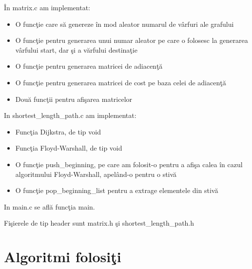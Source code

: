 \documentclass{article}
\begin{document}
\^{I}n matrix.c am implementat:
\begin{itemize}
    \item O func\c{t}ie care s\u{a} genereze \^{i}n mod aleator numarul de v\^{a}rfuri ale grafului
    \item O func\c{t}ie pentru generarea unui numar aleator pe care o folosesc la generarea v\^{a}rfului start, dar \c{s}i a v\u{a}rfului destina\c{t}ie
    \item O func\c{t}ie pentru generarea matricei de adiacen\c{t}\u{a}
    \item O func\c{t}ie pentru generarea matricei de cost pe baza celei de adiacen\c{t}\u{a}
    \item Dou\u{a} func\c{t}ii pentru afi\c{s}area matricelor
\end{itemize}

In shortest\_length\_path.c am implementat:
\begin{itemize}
    \item Func\c{t}ia Dijkstra, de tip void
    \item Func\c{t}ia Floyd-Warshall, de tip void
    \item O func\c{t}ie push\_beginning, pe care am folosit-o pentru a afi\c{s}a calea \^{i}n cazul algoritmului Floyd-Warshall, apel\^{a}nd-o pentru o stiv\u{a}
    \item O func\c{t}ie pop\_beginning\_list pentru a extrage elementele din stiv\u{a}
\end{itemize}

In main.c se afl\u{a} func\c{t}ia main.

Fi\c{s}ierele de tip header sunt matrix.h \c{s}i shortest\_length\_path.h



\section{Algoritmi folosi\c{t}i}
\end{document}
